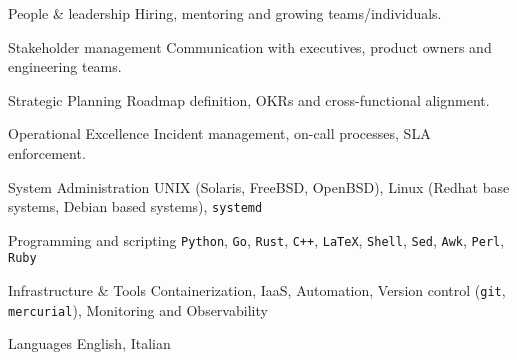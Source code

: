 \begin{cvskills}

  \cvskill
  {People \& leadership} %
  {Hiring, mentoring and growing teams/individuals.}

  \cvskill
  {Stakeholder management} %
  {Communication with executives, product owners and engineering teams.}

  \cvskill
  {Strategic Planning} %
  {Roadmap definition, OKRs and cross-functional alignment.}

  \cvskill
  {Operational Excellence} %
  {Incident management, on-call processes, SLA enforcement.}

  \cvskill
  {System Administration} %
  {UNIX (Solaris, FreeBSD, OpenBSD), Linux (Redhat base systems, Debian based systems), \texttt{systemd}}

  \cvskill
  {Programming and scripting} %
  {\texttt{Python}, \texttt{Go}, \texttt{Rust}, \texttt{C++}, \texttt{LaTeX}, \texttt{Shell}, \texttt{Sed}, \texttt{Awk}, \texttt{Perl}, \texttt{Ruby}} %

  \cvskill
  {Infrastructure \& Tools} %
  {Containerization, IaaS, Automation, Version control (\texttt{git}, \texttt{mercurial}), Monitoring and Observability}

  \cvskill
  {Languages} %
  {English, Italian} %

\end{cvskills}


